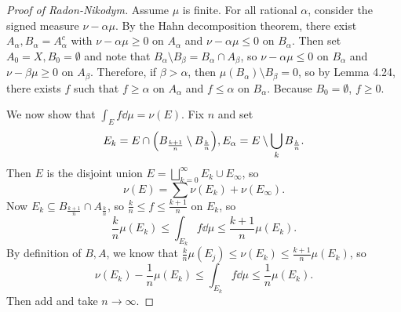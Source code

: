 \documentclass[leqno, openany]{memoir}
\theoremstyle{definition}
\theoremstyle{remark}
\theoremstyle{plain}
\theoremstyle{definition}
\theoremstyle{remark}
\begin{document}
\begin{proof}[Proof of Radon-Nikodym]
    Assume $\mu$ is finite. For all rational $\alpha$, consider the signed measure $\nu - \alpha \mu$. By the Hahn decomposition theorem, there exist $A_{\alpha}, B_{\alpha} = A_{\alpha}^c$ with $\nu - \alpha \mu \geq 0$ on $A_{\alpha}$ and $\nu - \alpha \mu \leq 0$ on $B_{\alpha}$. Then set $A_0 = X, B_0 = \emptyset$ and note that $B_{\alpha} \setminus B_{\beta} = B_{\alpha} \cap A_{\beta}$, so $\nu - \alpha \mu \leq 0$ on $B_{\alpha}$ and $\nu - \beta \mu \geq 0$ on $A_{\beta}$. Therefore, if $\beta > \alpha$, then $\mu(B_{\alpha}) \setminus B_{\beta} = 0$, so by Lemma 4.24, there exists $f$ such that $f \geq \alpha$ on $A_{\alpha}$ and $f \leq \alpha$ on $B_{\alpha}$. Because $B_0 = \emptyset$, $f \geq 0$.

    We now show that $\int_E f \dd{\mu} = \nu(E)$. Fix $n$ and set 
    \[ E_k = E \cap \qty( B_{\frac{k+1}{n}} \setminus B_{\frac{k}{n}} ), E_{\alpha} = E \setminus \bigcup_k B_{\frac{k}{n}}. \] 
    Then $E$ is the disjoint union $E = \bigsqcup_{k=0}^{\infty} E_k \cup E_{\infty}$, so
    \[ \nu(E) = \sum \nu(E_k) + \nu(E_{\infty}). \]
    Now $E_k \subseteq B_{\frac{k+1}{n}} \cap A_{\frac{k}{n}}$, so $\frac{k}{n} \leq f \leq \frac{k+1}{n}$ on $E_k$, so
    \[ \frac{k}{n} \mu(E_k) \leq \int_{E_k} f \dd{\mu} \leq \frac{k+1}{n} \mu(E_k). \]
    By definition of $B, A$, we know that $\frac{k}{n} \mu(E_j) \leq \nu(E_k) \leq \frac{k+1}{n} \mu(E_k)$, so
    \[ \nu(E_k) - \frac{1}{n} \mu(E_k) \leq \int_{E_k} f \dd{\mu} \leq \frac{1}{n} \mu(E_k). \]
    Then add and take $n \to \infty$.
\end{proof}
\end{document}
